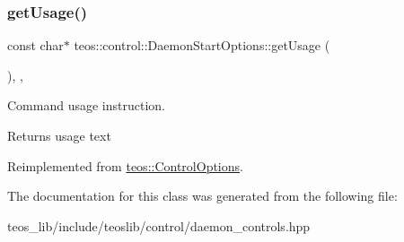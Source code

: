 \subsubsection{\texorpdfstring{get\+Usage()}{getUsage()}}
{\footnotesize\ttfamily const char$\ast$ teos\+::control\+::\+Daemon\+Start\+Options\+::get\+Usage (\begin{DoxyParamCaption}{ }\end{DoxyParamCaption})\hspace{0.3cm}{\ttfamily [inline]}, {\ttfamily [protected]}, {\ttfamily [virtual]}}



Command \textquotesingle{}usage\textquotesingle{} instruction. 

\begin{DoxyReturn}{Returns}
usage text 
\end{DoxyReturn}


Reimplemented from \mbox{\hyperlink{classteos_1_1_control_options_a0aa5671f9bc750ed5280c26c543874f3}{teos\+::\+Control\+Options}}.



The documentation for this class was generated from the following file\+:\begin{DoxyCompactItemize}
\item 
teos\+\_\+lib/include/teoslib/control/daemon\+\_\+controls.\+hpp\end{DoxyCompactItemize}

